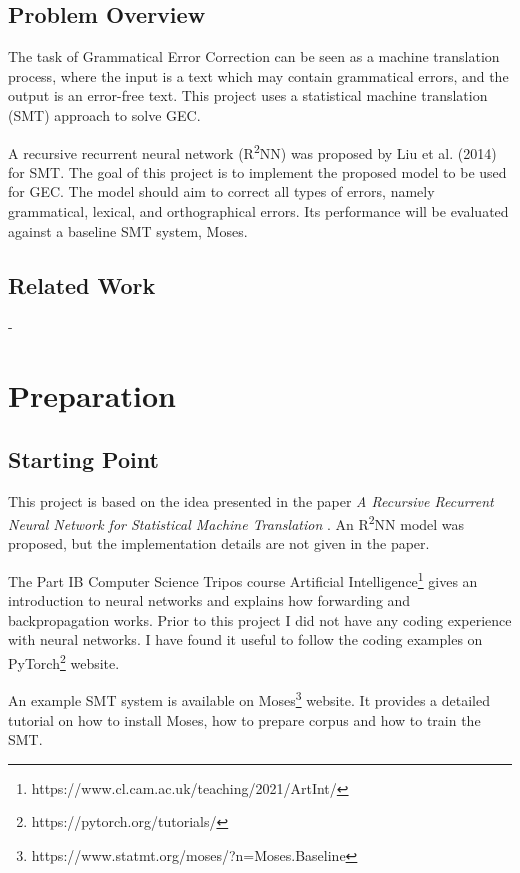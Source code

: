 \documentclass[12pt,a4paper,twoside,openright]{report}
\begin{document}
\section{Problem Overview}

The task of Grammatical Error Correction can be seen as a machine translation process, where the input is a text which may contain grammatical errors, and the output is an error-free text. This project uses a statistical machine translation (SMT) approach to solve GEC.

A recursive recurrent neural network (R\textsuperscript{2}NN) was proposed by Liu et al. (2014) \cite{r2nn} for SMT. The goal of this project is to implement the proposed model to be used for GEC. The model should aim to correct all types of errors, namely grammatical, lexical, and orthographical errors. Its performance will be evaluated against a baseline SMT system, Moses\cite{moses}.


\section{Related Work}
-

\chapter{Preparation}

\section{Starting Point}

This project is based on the idea presented in the paper \textit{A Recursive Recurrent Neural Network for Statistical Machine Translation} \cite{r2nn}. An R\textsuperscript{2}NN model was proposed, but the implementation details are not given in the paper.

The Part IB Computer Science Tripos course Artificial Intelligence\footnote{https://www.cl.cam.ac.uk/teaching/2021/ArtInt/} gives an introduction to neural networks and explains how forwarding and backpropagation works. Prior to this project I did not have any coding experience with neural networks. I have found it useful to follow the coding examples on PyTorch\footnote{https://pytorch.org/tutorials/} website.

An example SMT system is available on Moses\footnote{https://www.statmt.org/moses/?n=Moses.Baseline} website. It provides a detailed tutorial on how to install Moses, how to prepare corpus and how to train the SMT.
\end{document}

